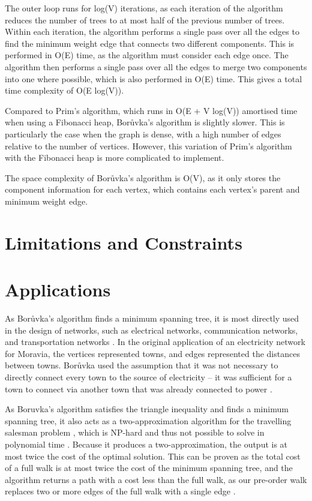 \documentclass[a4paper, 11pt]{article}
\begin{document}
The outer loop runs for log(V) iterations, as each iteration of the algorithm reduces the number of trees to at most half of the previous number of trees. Within each iteration, the algorithm performs a single pass over all the edges to find the minimum weight edge that connects two different components. This is performed in O(E) time, as the algorithm must consider each edge once. The algorithm then performs a single pass over all the edges to merge two components into one where possible, which is also performed in O(E) time. This gives a total time complexity of O(E log(V)).

Compared to Prim's algorithm, which runs in O(E + V log(V)) amortised time when using a Fibonacci heap, Borůvka's algorithm is slightly slower. This is particularly the case when the graph is dense, with a high number of edges relative to the number of vertices. However, this variation of Prim's algorithm with the Fibonacci heap is more complicated to implement.

The space complexity of Borůvka's algorithm is O(V), as it only stores the component information for each vertex, which contains each vertex's parent and minimum weight edge.

\section{Limitations and Constraints}

\section{Applications}
As Borůvka's algorithm finds a minimum spanning tree, it is most directly used in the design of networks, such as electrical networks, communication networks, and transportation networks \cite{graham1985history}. In the original application of an electricity network for Moravia, the vertices represented towns, and edges represented the distances between towns. Borůvka used the assumption that it was not necessary to directly connect every town to the source of electricity -- it was sufficient for a town to connect via another town that was already connected to power \cite{nevsetvril2001otakar}.

As Boruvka's algorithm satisfies the triangle inequality and finds a minimum spanning tree, it also acts as a two-approximation algorithm for the travelling salesman problem \cite{andreae1995performance}, which is NP-hard and thus not possible to solve in polynomial time \cite{junger1995traveling}. Because it produces a two-approximation, the output is at most twice the cost of the optimal solution. This can be proven as the total cost of a full walk is at most twice the cost of the minimum spanning tree, and the algorithm returns a path with a cost less than the full walk, as our pre-order walk replaces two or more edges of the full walk with a single edge \cite{andreae1995performance}.
\end{document}
